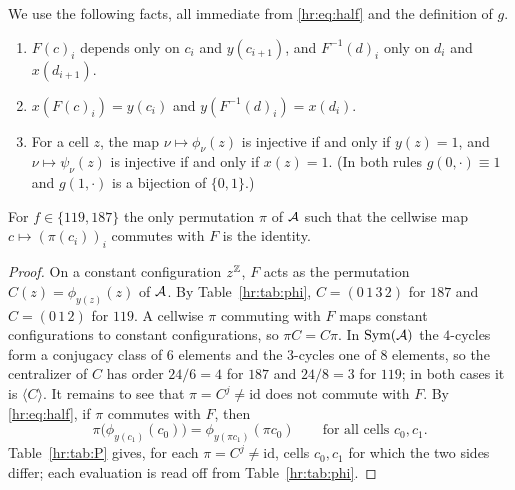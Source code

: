 We use the following facts, all immediate from \eqref{hr:eq:half} and the definition of $g$.
\begin{enumerate}
\item[(a)] $F(c)_i$ depends only on $c_i$ and $y(c_{i+1})$, and $F^{-1}(d)_i$ only on $d_i$ and $x(d_{i+1})$.
\item[(b)] $x(F(c)_i)=y(c_i)$ and $y(F^{-1}(d)_i)=x(d_i)$.
\item[(c)] For a cell $z$, the map $\nu\mapsto\phi_\nu(z)$ is injective if and only if $y(z)=1$, and $\nu\mapsto\psi_\nu(z)$ is injective if and only if $x(z)=1$. (In both rules $g(0,\cdot)\equiv1$ and $g(1,\cdot)$ is a bijection of $\{0,1\}$.)
\end{enumerate}

\begin{lemma}\label{hr:lem:P}
For $f\in\{119,187\}$ the only permutation $\pi$ of $\mathcal{A}$ such that the cellwise map $c\mapsto(\pi(c_i))_i$ commutes with $F$ is the identity.
\end{lemma}

\begin{proof}
On a constant configuration $z^{\mathbb{Z}}$, $F$ acts as the permutation $C(z)=\phi_{y(z)}(z)$ of $\mathcal{A}$. By Table~\ref{hr:tab:phi}, $C=(0\,1\,3\,2)$ for $187$ and $C=(0\,1\,2)$ for $119$. A cellwise $\pi$ commuting with $F$ maps constant configurations to constant configurations, so $\pi C=C\pi$. In $\operatorname{Sym}(\mathcal{A})$ the $4$-cycles form a conjugacy class of $6$ elements and the $3$-cycles one of $8$ elements, so the centralizer of $C$ has order $24/6=4$ for $187$ and $24/8=3$ for $119$; in both cases it is $\langle C\rangle$. It remains to see that $\pi=C^j\ne\mathrm{id}$ does not commute with $F$. By \eqref{hr:eq:half}, if $\pi$ commutes with $F$, then
\[
\pi\bigl(\phi_{y(c_1)}(c_0)\bigr)=\phi_{y(\pi c_1)}(\pi c_0)\qquad\text{for all cells }c_0,c_1.
\]
Table~\ref{hr:tab:P} gives, for each $\pi=C^j\ne\mathrm{id}$, cells $c_0,c_1$ for which the two sides differ; each evaluation is read off from Table~\ref{hr:tab:phi}.
\end{proof}

